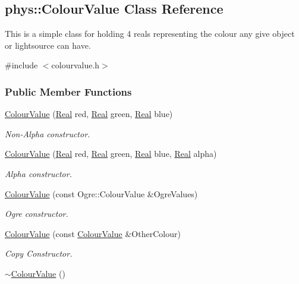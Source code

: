 \hypertarget{classphys_1_1ColourValue}{
\subsection{phys::ColourValue Class Reference}
\label{d3/db0/classphys_1_1ColourValue}
}


This is a simple class for holding 4 reals representing the colour any give object or lightsource can have.  




{\ttfamily \#include $<$colourvalue.h$>$}

\subsubsection*{Public Member Functions}
\begin{DoxyCompactItemize}
\item 
\hyperlink{classphys_1_1ColourValue_ac63b5fbf1b35b1855330ed5737fc16e0}{ColourValue} (\hyperlink{namespacephys_af7eb897198d265b8e868f45240230d5f}{Real} red, \hyperlink{namespacephys_af7eb897198d265b8e868f45240230d5f}{Real} green, \hyperlink{namespacephys_af7eb897198d265b8e868f45240230d5f}{Real} blue)
\begin{DoxyCompactList}\small\item\em Non-\/Alpha constructor. \item\end{DoxyCompactList}\item 
\hyperlink{classphys_1_1ColourValue_a28ee2493cd6a7bb8bc4104d223e3e709}{ColourValue} (\hyperlink{namespacephys_af7eb897198d265b8e868f45240230d5f}{Real} red, \hyperlink{namespacephys_af7eb897198d265b8e868f45240230d5f}{Real} green, \hyperlink{namespacephys_af7eb897198d265b8e868f45240230d5f}{Real} blue, \hyperlink{namespacephys_af7eb897198d265b8e868f45240230d5f}{Real} alpha)
\begin{DoxyCompactList}\small\item\em Alpha constructor. \item\end{DoxyCompactList}\item 
\hyperlink{classphys_1_1ColourValue_ac814df9f1709186fa6aeadbca8e0ed9f}{ColourValue} (const Ogre::ColourValue \&OgreValues)
\begin{DoxyCompactList}\small\item\em Ogre constructor. \item\end{DoxyCompactList}\item 
\hyperlink{classphys_1_1ColourValue_add6b3ac7e9809dce240cd584b94e8c67}{ColourValue} (const \hyperlink{classphys_1_1ColourValue}{ColourValue} \&OtherColour)
\begin{DoxyCompactList}\small\item\em Copy Constructor. \item\end{DoxyCompactList}\item 
\hypertarget{classphys_1_1ColourValue_adc37cfdba61d80ad23765cea5c858751}{
\hyperlink{classphys_1_1ColourValue_adc37cfdba61d80ad23765cea5c858751}{$\sim$ColourValue} ()}
\label{d3/db0/classphys_1_1ColourValue_adc37cfdba61d80ad23765cea5c858751}


\end{DoxyCompactItemize}
